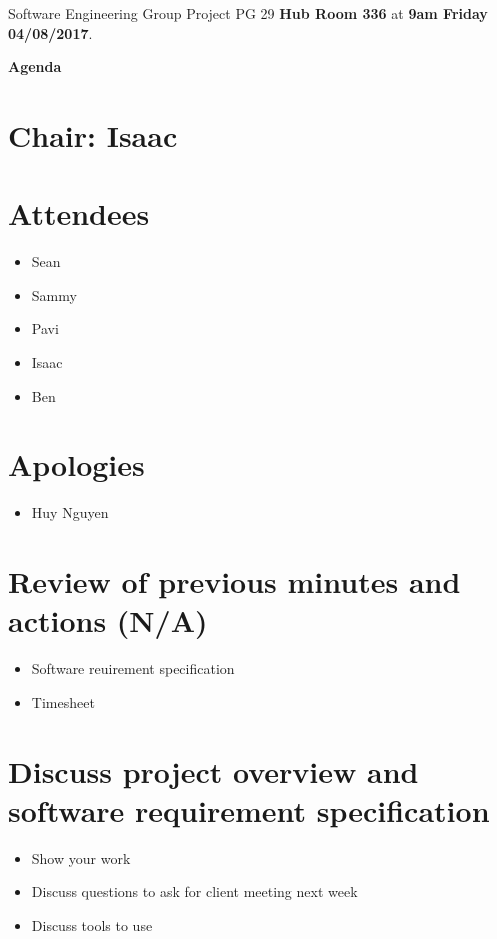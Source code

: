 \documentclass[11pt, a4paper]{article}
\begin{document}
\noindent Software Engineering Group Project PG 29 {\bf Hub Room 336} at {\bf 9am Friday 04/08/2017}.
\vspace*{10pt}
\begin{center}
\huge \bf Agenda
\end{center}

\section*{Chair: Isaac}

\vspace*{10pt}

\section{Attendees}
\begin{itemize}
\item Sean
\item Sammy
\item Pavi
\item Isaac
\item Ben
\end{itemize}
\section{Apologies}
\begin{itemize}
\item Huy Nguyen
\end{itemize}

\section{Review of previous minutes and actions (N/A)}
\begin{itemize}
\item Software reuirement specification
\item Timesheet 
\end{itemize}

\section{Discuss project overview and software requirement specification}
\begin{itemize}
\item Show your work
\item Discuss questions to ask for client meeting next week
\item Discuss tools to use
\end{itemize}
\end{document}
